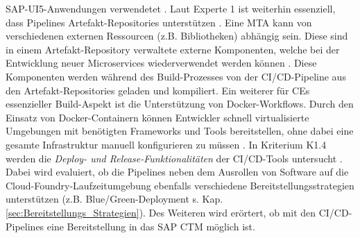 SAP-UI5-Anwendungen verwendetet \cite{.20230405b}. Laut Experte 1 ist weiterhin essenziell, dass Pipelines Artefakt-Repositories unterstützen \cite[Z. 37 ff.]{ProductOwnerSAPBTPProd&Infra.}. Eine MTA kann von verschiedenen externen Ressourcen (z.B. Bibliotheken) abhängig sein. Diese sind in einem Artefakt-Repository verwaltete externe Komponenten, welche bei der Entwicklung neuer Microservices wiederverwendet werden können \cite[Z. 40]{ProductOwnerSAPBTPProd&Infra.}. Diese Komponenten werden während des Build-Prozesses von der CI/CD-Pipeline aus den Artefakt-Repositories geladen und kompiliert. Ein weiterer für CEs essenzieller Build-Aspekt ist die Unterstützung von Docker-Workflows. Durch den Einsatz von Docker-Containern können Entwickler schnell virtualisierte Umgebungen mit benötigten Frameworks und Tools bereitstellen, ohne dabei eine gesamte Infrastruktur manuell konfigurieren zu müssen \cite{Arora.20200504}. In Kriterium K1.4 werden die \textit{Deploy- und Release-Funktionalitäten} der CI/CD-Tools untersucht \cite[Z. 68 ff.]{ProductOwnerSAPBTPProd&Infra.}. Dabei wird evaluiert, ob die Pipelines neben dem Ausrollen von Software auf die Cloud-Foundry-Laufzeitumgebung ebenfalls verschiedene Bereitstellungsstrategien unterstützen (z.B. Blue/Green-Deployment s. Kap. \ref{sec:Bereitstellungs_Strategien}). Des Weiteren wird erörtert, ob mit den CI/CD-Pipelines eine Bereitstellung in das \ac{SAP CTM} möglich ist.
